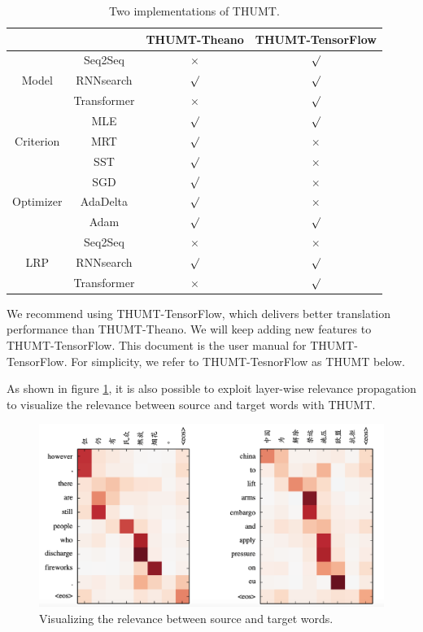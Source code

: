 \documentclass{article}
\begin{document}
\begin{table}[!t]
\centering
\begin{tabular}{|c|c|c|c|}
\cline{3-4}
\multicolumn{2}{c|}{} & THUMT-Theano & THUMT-TensorFlow \\
\hline
 & Seq2Seq &  $\times$ & $\surd$ \\
Model           & RNNsearch & $\surd$ & $\surd$ \\
           & Transformer & $\times$ & $\surd$ \\
\hline
 & MLE & $\surd$ & $\surd$ \\

Criterion               & MRT & $\surd$ & $\times$ \\
               & SST & $\surd$ & $\times$ \\
\hline
 & SGD & $\surd$ & $\times$ \\
Optimizer & AdaDelta & $\surd$ & $\times$ \\
 & Adam & $\surd$ & $\surd$ \\
\hline
  & Seq2Seq & $\times$ & $\times$ \\
LRP        & RNNsearch & $\surd$ & $\surd$ \\
        & Transformer & $\times$ & $\surd$ \\
\hline
\end{tabular}
\caption{Two implementations of THUMT.} \label{table:1:implementation}
\end{table}

We recommend using THUMT-TensorFlow, which delivers better translation performance than THUMT-Theano. We will keep adding new features to THUMT-TensorFlow. This document is the user manual for THUMT-TensorFlow. For simplicity, we refer to THUMT-TesnorFlow as THUMT below.

As shown in figure \ref{fig:visualization}, it is also possible to exploit layer-wise relevance propagation \cite{Ding:17} to visualize the relevance between source and target words with THUMT. 

\begin{figure}[h]
    \centering
    \includegraphics[width=1\textwidth]{fig/vis_transformer.png}
    \caption{Visualizing the relevance between source and target words.}
    \label{fig:visualization}
\end{figure}
\end{document}
